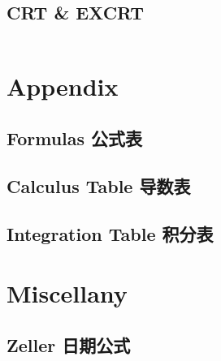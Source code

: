 \documentclass[titlepage, a4paper]{article}
\begin{document}
\begin{multicols}{2}
\begin{spacing}{0.6}
				\subsection{CRT \& EXCRT} 
					\inputminted{cpp}{src/Math Combinatorics/CRT.cpp}

			\section{Appendix}
				\begin{spacing}{0.5}
				\subsection{Formulas 公式表}
					
				\subsection{Calculus Table 导数表}
					
				\subsection{Integration Table 积分表}
					
				\end{spacing}
			\section{Miscellany}
				\subsection{Zeller 日期公式}
					\inputminted{cpp}{src/Miscellany/日期公式.cpp}

\end{spacing}
\end{multicols}
\end{document}
